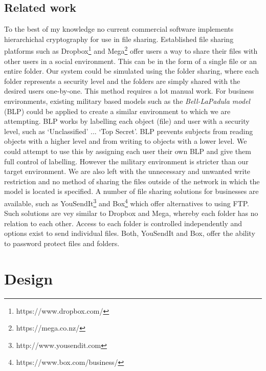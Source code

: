 \documentclass[12pt, titlepage]{article}
\begin{document}
\subsection{Related work}
To the best of my knowledge no current commercial software implements hierarchichal cryptography for use in file sharing.
\newline \indent Established file sharing platforms such as Dropbox\footnote{https://www.dropbox.com/} and Mega\footnote{https://mega.co.nz/} offer users a way to share their files with other users in a social environment. This can be in the form of a single file or an entire folder. Our system could be simulated using the folder sharing, where each folder represents a security level and the folders are simply shared with the desired users one-by-one. This method requires a lot manual work.
\newline \indent For business environments, existing military based models such as the \textit{Bell-LaPadula model} (BLP) could be applied to create a similar environment to which we are attempting. BLP works by labelling each object (file) and user with a security level, such as `Unclassified' ... `Top Secret'. BLP prevents subjects from reading objects with a higher level and from writing to objects with a lower level. We could attempt to use this by assigning each user their own BLP and give them full control of labelling. However the military environment is stricter than our target environment. We are also left with the unnecessary and unwanted write restriction and no method of sharing the files outside of the network in which the model is located is specified.
\newline \indent A number of file sharing solutions for businesses are available, such as YouSendIt\footnote{http://www.yousendit.com} and Box\footnote{https://www.box.com/business/} which offer alternatives to using FTP. Such solutions are vey similar to Dropbox and Mega, whereby each folder has no relation to each other. Access to each folder is controlled independently and options exist to send individual files. Both, YouSendIt and Box, offer the ability to password protect files and folders.

\newpage
\section{Design}
\end{document}
